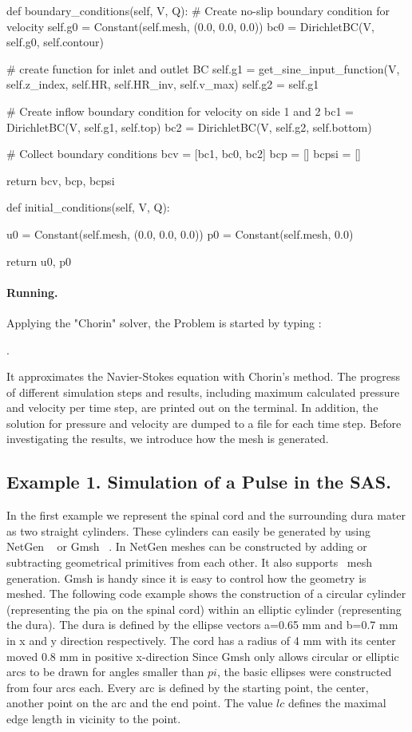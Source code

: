 \begin{python}
def boundary_conditions(self, V, Q):
	# Create no-slip boundary condition for velocity
	self.g0 = Constant(self.mesh, (0.0, 0.0, 0.0))
	bc0 = DirichletBC(V, self.g0, self.contour)

	# create function for inlet and outlet BC
	self.g1 = get_sine_input_function(V, self.z_index, self.HR, self.HR_inv, self.v_max)
	self.g2 = self.g1

	# Create inflow boundary condition for velocity on side 1 and 2
	bc1 = DirichletBC(V, self.g1, self.top)
	bc2 = DirichletBC(V, self.g2, self.bottom)

	# Collect boundary conditions
	bcv = [bc1, bc0, bc2]
	bcp = []
	bcpsi = []

	return bcv, bcp, bcpsi

def initial_conditions(self, V, Q):

	u0 = Constant(self.mesh, (0.0, 0.0, 0.0))
	p0 = Constant(self.mesh, 0.0)

	return u0, p0
\end{python}


\paragraph{Running.}
Applying the "Chorin" solver, the Problem is started by typing :

.

It approximates the Navier-Stokes equation with Chorin's method. The progress of different simulation steps and results, including maximum calculated pressure and velocity per time step, are printed out on the terminal. In addition, the solution for pressure and velocity are dumped to a file for each  time step. Before investigating the results, we introduce how the mesh is generated.


\subsection{Example 1. Simulation of a Pulse in the SAS.}
In the first example we represent the spinal cord and the surrounding dura mater as two straight cylinders.  These cylinders can easily be generated by using NetGen ~\cite{netgen} or Gmsh ~\cite{gmsh}.  In NetGen meshes can be constructed by adding or subtracting geometrical primitives from each other. It also supports \dolfin\ mesh generation. Gmsh is handy since it is easy to control how the geometry is meshed. The following code example shows the construction of a circular cylinder (representing the pia on the spinal cord) within an elliptic cylinder (representing the dura). The dura is defined by the ellipse vectors a=0.65 mm and b=0.7 mm in x and y direction respectively. The cord has a radius of 4 mm with its center moved 0.8 mm in positive x-direction  Since Gmsh only allows circular or elliptic arcs to be drawn for angles smaller than $pi$, the basic ellipses were constructed from four arcs each. Every arc is defined by the starting point, the center, another point on the arc and the end point. The value $lc$  defines the maximal edge length in vicinity to the point.

